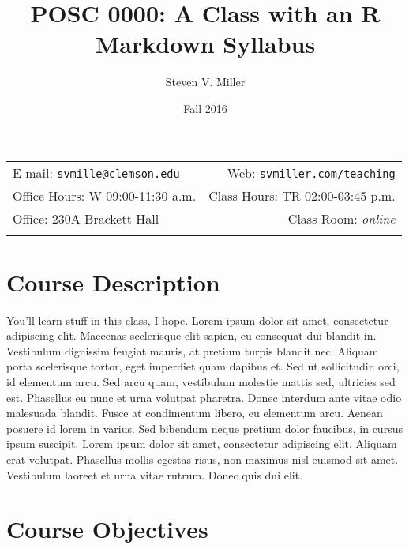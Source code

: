 \documentclass[11pt,]{article}
\title{POSC 0000: A Class with an R Markdown Syllabus}
\author{Steven V. Miller}
\date{Fall 2016}
\begin{document}
  

		\maketitle
		
	
		\thispagestyle{firststyle}



	\noindent \begin{tabular*}{\textwidth}{ @{\extracolsep{\fill}} lr @{\extracolsep{\fill}}}


E-mail: \texttt{\href{mailto:svmille@clemson.edu}{\nolinkurl{svmille@clemson.edu}}} & Web: \href{http://svmiller.com/teaching}{\tt svmiller.com/teaching}\\
Office Hours: W 09:00-11:30 a.m.  &  Class Hours: TR 02:00-03:45 p.m.\\
Office: 230A Brackett Hall  & Class Room: \emph{online}\\
	&  \\
	\hline
	\end{tabular*}
	
\vspace{2mm}
	


\hypertarget{course-description}{%
\section{Course Description}\label{course-description}}

You'll learn stuff in this class, I hope. Lorem ipsum dolor sit amet,
consectetur adipiscing elit. Maecenas scelerisque elit sapien, eu
consequat dui blandit in. Vestibulum dignissim feugiat mauris, at
pretium turpis blandit nec. Aliquam porta scelerisque tortor, eget
imperdiet quam dapibus et. Sed ut sollicitudin orci, id elementum arcu.
Sed arcu quam, vestibulum molestie mattis sed, ultricies sed est.
Phasellus eu nunc et urna volutpat pharetra. Donec interdum ante vitae
odio malesuada blandit. Fusce at condimentum libero, eu elementum arcu.
Aenean posuere id lorem in varius. Sed bibendum neque pretium dolor
faucibus, in cursus ipsum suscipit. Lorem ipsum dolor sit amet,
consectetur adipiscing elit. Aliquam erat volutpat. Phasellus mollis
egestas risus, non maximus nisl euismod sit amet. Vestibulum laoreet et
urna vitae rutrum. Donec quis dui elit.

\hypertarget{course-objectives}{%
\section{Course Objectives}\label{course-objectives}}
\end{document}
